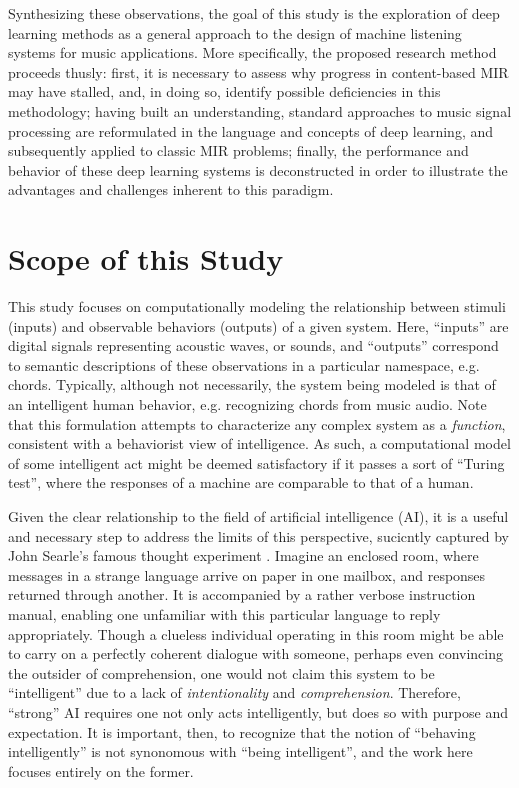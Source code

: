 Synthesizing these observations, the goal of this study is the exploration of deep learning methods as a general approach to the design of machine listening systems for music applications.
More specifically, the proposed research method proceeds thusly:
first, it is necessary to assess why progress in content-based MIR may have stalled, and, in doing so, identify possible deficiencies in this methodology;
having built an understanding, standard approaches to music signal processing are reformulated in the language and concepts of deep learning, and subsequently applied to classic MIR problems;
finally, the performance and behavior of these deep learning systems is deconstructed in order to illustrate the advantages and challenges inherent to this paradigm.


\section{Scope of this Study}
\label{sec:scope}

%

This study focuses on computationally modeling the relationship between stimuli (inputs) and observable behaviors (outputs) of a given system.
Here, ``inputs'' are digital signals representing acoustic waves, or sounds, and ``outputs'' correspond to semantic descriptions of these observations in a particular namespace, e.g. chords.
Typically, although not necessarily, the system being modeled is that of an intelligent human behavior, e.g. recognizing chords from music audio.
Note that this formulation attempts to characterize any complex system as a \emph{function}, consistent with a behaviorist view of intelligence.
As such, a computational model of some intelligent act might be deemed satisfactory if it passes a sort of ``Turing test'', where the responses of a machine are comparable to that of a human.

Given the clear relationship to the field of artificial intelligence (AI), it is a useful and necessary step to address the limits of this perspective, sucicntly captured by John Searle's famous thought experiment \cite{Searle1960?}.
Imagine an enclosed room, where messages in a strange language arrive on paper in one mailbox, and responses returned through another.
It is accompanied by a rather verbose instruction manual, enabling one unfamiliar with this particular language to reply appropriately.
Though a clueless individual operating in this room might be able to carry on a perfectly coherent dialogue with someone, perhaps even convincing the outsider of comprehension, one would not claim this system to be ``intelligent'' due to a lack of \emph{intentionality} and \emph{comprehension}.
Therefore, ``strong'' AI requires one not only acts intelligently, but does so with purpose and expectation.
It is important, then, to recognize that the notion of ``behaving intelligently'' is not synonomous with ``being intelligent'', and the work here focuses entirely on the former.

